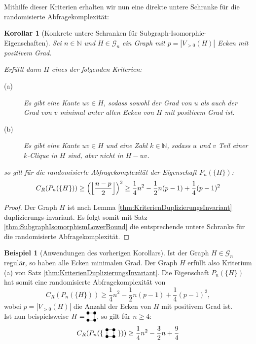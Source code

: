\documentclass[10pt,a4paper, footheight=1mm]{scrreprt}
\newtheorem{corollary}[definition]{Korollar}
\theoremstyle{definition}
\newtheorem{examplex}{Beispiel}
\newenvironment{example}[1]
{ \begin{leftbar} \begin{examplex}#1}
{ \end{examplex} \ignorespacesafterend \end{leftbar} }
\newcommand{\Square}{
\begin{tikzpicture}[main_node/.style={circle,fill=black},
inner sep=1.5pt, baseline=2pt]

    \node[main_node] (1) at (0,0) {};
    \node[main_node] (2) at (0.35, 0)  {};
    \node[main_node] (3) at (0.35, 0.35) {};
    \node[main_node] (4) at (0, 0.35) {};

    \draw (1) -- (2) -- (3) -- (4) -- (1);
\end{tikzpicture}
}
\begin{document}
Mithilfe dieser Kriterien erhalten wir nun
eine direkte untere Schranke für die randomisierte Abfragekomplexität:
\begin{corollary}[Konkrete untere Schranken für Subgraph-Isomorphie-Eigenschaften]
Sei $n\in \mathbb{N}$ und $H\in \mathcal{G}_n$ ein Graph
mit $p=|V_{>0}(H)|$ Ecken mit positivem Grad.

Erfüllt dann $H$ eines der folgenden Kriterien:
\begin{description}
\item[(a)] Es gibt eine Kante $uv\in H$, sodass sowohl
           der Grad von $u$ als auch der Grad von $v$
           minimal unter allen Ecken von $H$ mit positivem
           Grad ist.
\item[(b)] Es gibt eine Kante $uv \in H$ und eine Zahl
           $k\in \mathbb{N}$, sodass $u$ und $v$
           Teil einer $k$-Clique in $H$ sind, aber nicht
           in $H-uv$.
\end{description}
so gilt für die randomisierte Abfragekomplexität der Eigenschaft 
$P_n(\{H\})$:
$$ C_R(P_n(\{H\})) \geq
\Big{ ( } \Big \lfloor  \frac{n-p}{2} \Big \rfloor \Big{)}^{2} \geq
\frac{1}{4}n^2 - \frac{1}{2}n(p-1) + \frac{1}{4}(p-1)^2
$$
\end{corollary}
\begin{proof}
Der Graph $H$ ist nach Lemma \ref{thm:KriterienDuplizierungsInvariant}
duplizierungs-invariant. Es folgt somit mit 
Satz \ref{thm:SubgraphIsomorphismLowerBound} die entsprechende
untere Schranke für die randomisierte Abfragekomplexität.
\end{proof}

\begin{example}[Anwendungen des vorherigen Korollars]
Ist der Graph $H\in\mathcal{G}_n$ regulär, so haben
alle Ecken minimalen Grad. Der Graph $H$ erfüllt also Kriterium (a)
von Satz \ref{thm:KriterienDuplizierungsInvariant}.
Die Eigenschaft $P_n(\{H\})$ hat somit eine randomisierte
Abfragekomplexität von 
$$ C_R(P_n(\{H\})) \geq
\frac{1}{4}n^2 - \frac{1}{2}n(p-1) + \frac{1}{4}(p-1)^2,$$
wobei $p=|V_{>0}(H)|$ die Anzahl der Ecken von $H$ mit
positivem Grad ist. \\
Ist nun beispielsweise $H=\Square$, so gilt für $n\geq 4$:
$$ C_R(P_n(\{\ \Square \ \})) \geq
\frac{1}{4}n^2 - \frac{3}{2}n + \frac{9}{4}$$
\end{example}
\end{document}
